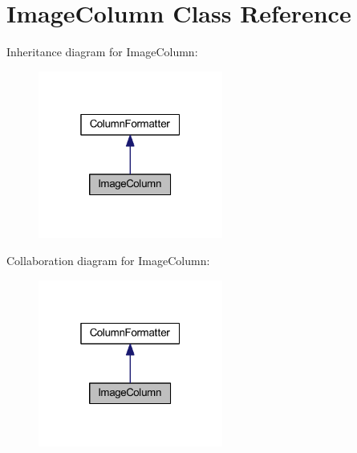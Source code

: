 \hypertarget{classhamburgscleanest_1_1_data_tables_1_1_models_1_1_column_formatters_1_1_image_column}{}\section{Image\+Column Class Reference}
\label{classhamburgscleanest_1_1_data_tables_1_1_models_1_1_column_formatters_1_1_image_column}


Inheritance diagram for Image\+Column\+:
\nopagebreak
\begin{figure}[H]
\begin{center}
\leavevmode
\includegraphics[width=172pt]{classhamburgscleanest_1_1_data_tables_1_1_models_1_1_column_formatters_1_1_image_column__inherit__graph}
\end{center}
\end{figure}


Collaboration diagram for Image\+Column\+:
\nopagebreak
\begin{figure}[H]
\begin{center}
\leavevmode
\includegraphics[width=172pt]{classhamburgscleanest_1_1_data_tables_1_1_models_1_1_column_formatters_1_1_image_column__coll__graph}
\end{center}
\end{figure}
